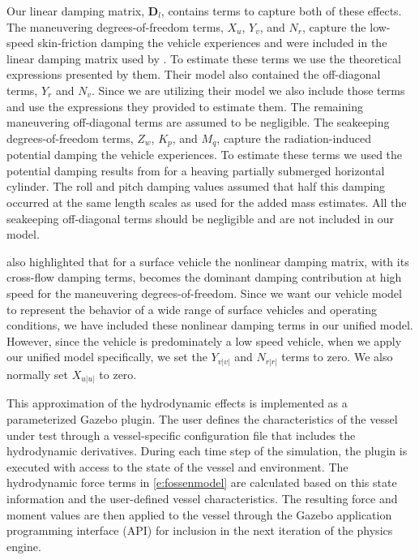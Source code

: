 \documentclass[11pt, letterpaper]{article}
\begin{document}
Our linear damping matrix, $\bm{D}_l$, contains terms to capture both of these effects. The maneuvering degrees-of-freedom terms, $X_{u}$, $Y_{v}$, and $N_{r}$, capture the low-speed skin-friction damping the vehicle experiences and were included in the linear damping matrix used by \citet{sarda16station}. To estimate these terms we use the theoretical expressions presented by them. Their model also contained the off-diagonal terms, $Y_{r}$ and $N_{v}$. Since we are utilizing their model we also include those terms and use the expressions they provided to estimate them. The remaining maneuvering off-diagonal terms are assumed to be negligible. The seakeeping degrees-of-freedom terms, $Z_{w}$, $K_{p}$, and $M_{q}$, capture the radiation-induced potential damping the vehicle experiences. To estimate these terms we used the potential damping results from \citet{greenhow88added} for a heaving partially submerged horizontal cylinder. The roll and pitch damping values assumed that half this damping occurred at the same length scales as used for the added mass estimates. All the seakeeping off-diagonal terms should be negligible and are not included in our model.

\citet{fossen11handbook} also highlighted that for a surface vehicle the nonlinear damping matrix, with its cross-flow damping terms, becomes the dominant damping contribution at high speed for the maneuvering degrees-of-freedom. Since we want our vehicle model to represent the behavior of a wide range of surface vehicles and operating conditions, we have included these nonlinear damping terms in our unified model. However, since the vehicle  is predominately a low speed vehicle, when we apply our unified model specifically, we set the $Y_{v|v|}$ and $N_{r|r|}$ terms to zero. We also normally set $X_{u|u|}$ to zero.

This approximation of the hydrodynamic effects is implemented as a parameterized Gazebo plugin.  The user defines the characteristics of the vessel under test through a vessel-specific configuration file that includes the hydrodynamic derivatives.  During each time step of the simulation, the plugin is executed with access to the state of the vessel and environment.  The hydrodynamic force terms in \eqref{e:fossenmodel} are calculated based on this state information and the user-defined vessel characteristics.  The resulting force and moment values are then applied to the vessel through the Gazebo application programming interface (API) for inclusion in the next iteration of the physics engine.
\end{document}
